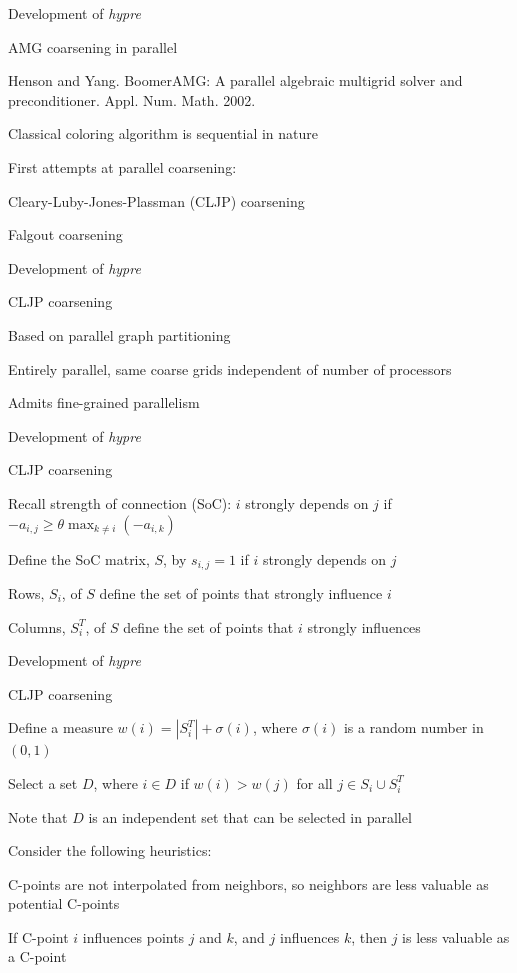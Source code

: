 \documentclass[18pt,xcolor=table]{beamer}
\begin{document}
\begin{frame}{Development of \emph{hypre}}
\begin{block}{AMG coarsening in parallel}
\bit
\item Henson and Yang. BoomerAMG: A parallel algebraic multigrid solver and preconditioner. Appl. Num. Math. 2002.
\item Classical coloring algorithm is sequential in nature
\item First attempts at parallel coarsening:
\bit
\item Cleary-Luby-Jones-Plassman (CLJP) coarsening
\item Falgout coarsening
\eit
\eit
\end{block}
\end{frame}

\begin{frame}{Development of \emph{hypre}}
\begin{block}{CLJP coarsening}
\bit
\item Based on parallel graph partitioning
\item Entirely parallel, same coarse grids independent of number of processors
\item Admits fine-grained parallelism
\eit
\end{block}
\end{frame}

\begin{frame}{Development of \emph{hypre}}
\begin{block}{CLJP coarsening}
\bit
\item Recall strength of connection (SoC): $i$ strongly depends on $j$ if $-a_{i,j} \geq \theta\max_{k\neq i}(-a_{i,k})$
\item Define the SoC matrix, $S$, by $s_{i,j} = 1$ if $i$ strongly depends on $j$
\item Rows, $S_i$, of $S$ define the set of points that strongly influence $i$
\item Columns, $S_i^T$, of $S$ define the set of points that $i$ strongly influences
\eit
\end{block}
\end{frame}

\begin{frame}{Development of \emph{hypre}}
\begin{block}{CLJP coarsening}
\bit
\item Define a measure $w(i) = |S_i^T| + \sigma(i)$, where $\sigma(i)$ is a random number in $(0,1)$
\item Select a set $D$, where $i\in D$ if $w(i)>w(j)$ for all $j\in S_i\cup S_i^T$
\item Note that $D$ is an independent set that can be selected in parallel
\item Consider the following heuristics:
\bit
\item C-points are not interpolated from neighbors, so neighbors are less valuable as potential C-points
\item If C-point $i$ influences points $j$ and $k$, and $j$ influences $k$, then $j$ is less valuable as a C-point
\eit
\eit
\end{block}
\end{frame}
\end{document}
